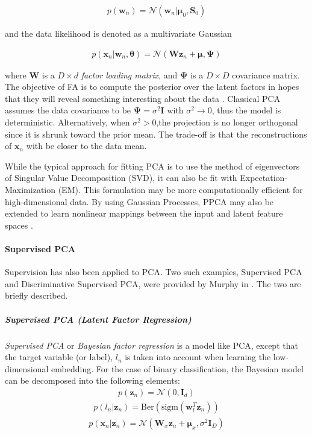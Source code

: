 \begin{align}
p(\bm{w}_n) = \mathcal{N}(\bm{w}_n|\bm{\mu}_0, \bm{S}_0)
\end{align}

\noindent
and the data likelihood is denoted as a multivariate Gaussian

\begin{align}
p(\bm{x}_n|\bm{w}_n,\bm{\theta}) = \mathcal{N}(\bm{W}\bm{z}_n + \bm{\mu}, \bm{\Psi})
\end{align}

\noindent
where $\bm{W}$ is a $D \times d$ \textit{factor loading matrix}, and $\bm{\Psi}$ is a $D \times D$ covariance matrix.  The objective of FA is to compute the posterior over the latent factors in hopes that they will reveal something interesting about the data \citep{Murphy2012}.  Classical PCA assumes the data covariance to be $\bm{\Psi} = \sigma^2\bm{I}$ with $\sigma^2 \rightarrow 0$, thus the model is deterministic.  Alternatively, when $\sigma^2 > 0$,the projection is no longer orthogonal since it is shrunk toward the prior mean.  The trade-off is that the reconstructions of $\bm{x}_n$ with be closer to the data mean.


While the typical approach for fitting PCA is to use the method of eigenvectors of Singular Value Decomposition (SVD), it can also be fit with Expectation-Maximization (EM).  This formulation may be more computationally efficient for high-dimensional data.  By using Gaussian Processes, PPCA may also be extended to learn nonlinear mappings between the input and latent feature spaces \citep{VanDerMaaten2009DRReview}.

\paragraph{Supervised PCA}

Supervision has also been applied to PCA.  Two such examples, Supervised PCA and Discriminative Supervised PCA, were provided by Murphy in \citep{Murphy2012}.  The two are briefly described. 

\subparagraph{Supervised PCA (Latent Factor Regression)}
\textit{Supervised PCA} or \textit{Bayesian factor regression} is a model like PCA, except that the target variable (or label), $l_n$ is taken into account when learning the low-dimensional embedding.  For the case of binary classification, the Bayesian model can be decomposed into the following elements:
\begin{align}
	p(\bm{z}_n) = \mathcal{N}(0,\bm{I}_d)
\end{align}
\begin{align}
	p(l_n|\bm{z}_n) = \text{Ber}(\text{sigm}(\bm{w}^{T}_{l}\bm{z}_n))
\end{align}
\begin{align}
	p(\bm{x}_n|\bm{z}_n) = \mathcal{N}(\bm{W}_{x}\bm{z}_{n} + \bm{\mu}_{x}, \sigma^{2}\bm{I}_D)
\end{align}

